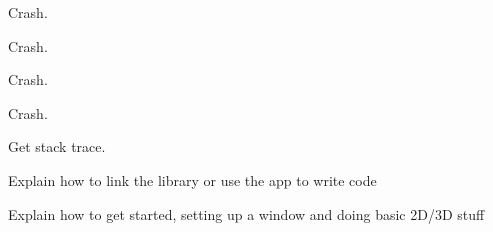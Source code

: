 
\begin{DoxyRefList}
\item[Global \mbox{\hyperlink{_errors_8c_ab17af6118ec5a69109949c0485f2bb9d}{n\+Error\+Throw}} (const int32\+\_\+t error, const char $\ast$info, int32\+\_\+t info\+Len)]\label{todo__todo000001}%
%
Crash. 

\label{todo__todo000002}%
%
Crash. 

\label{todo__todo000003}%
%
Crash.  
\item[Global \mbox{\hyperlink{_errors_8c_a5c2568530315002dcbfccaafc5821883}{n\+Error\+To\+String}} (char $\ast$dst, int32\+\_\+t $\ast$size, const int32\+\_\+t error, const char $\ast$info, int32\+\_\+t info\+Len)]\label{todo__todo000004}%
%
Crash.  
\item[Global \mbox{\hyperlink{_errors_8c_a51c5b711f13bd8a6090936b7b2c21ecb}{n\+Error\+Get\+Stacktrace}} (char $\ast$dst, int32\+\_\+t $\ast$size, int32\+\_\+t $\ast$levels)]\label{todo__todo000005}%
%
Get stack trace.  
\item[page \mbox{\hyperlink{index}{Nimble Game Engine Library}} ]\label{todo__todo000006}%
%
Explain how to link the library or use the app to write code 

\label{todo__todo000007}%
%
Explain how to get started, setting up a window and doing basic 2D/3D stuff
\end{DoxyRefList}